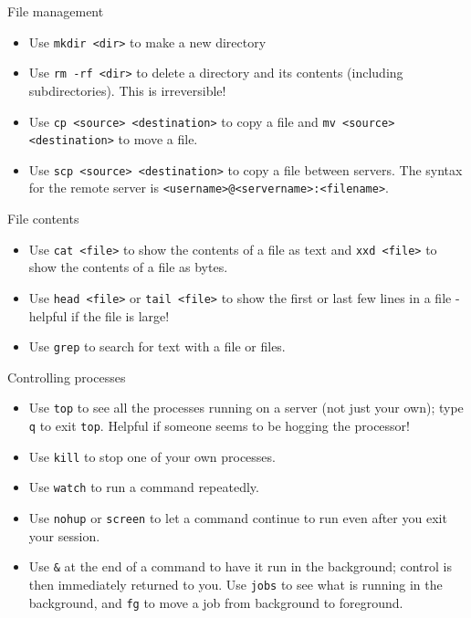 \documentclass[dvipsnames]{beamer}
\newcommand{\command}[1]{\colorbox{light-gray}{\texttt{#1}}}
\newcommand{\filename}[1]{\colorbox{light-green}{\texttt{#1}}}
\begin{document}
\begin{frame}{File management}
  \begin{itemize}
  \item Use \command{mkdir <dir>} to make a new directory
  \item Use \command{rm -rf <dir>} to delete a directory and its contents (including subdirectories). This is irreversible!
  \item Use \command{cp <source> <destination>} to copy a file and \command{mv <source> <destination>} to move a file.
  \item Use \command{scp <source> <destination>} to copy a file between servers. The syntax for the remote server is \filename{<username>@<servername>:<filename>}.
  \end{itemize}
\end{frame}


\begin{frame}{File contents}
  \begin{itemize}
  \item Use \command{cat <file>} to show the contents of a file as text and \command{xxd <file>} to show the contents of a file as bytes.
  \item Use \command{head <file>} or \command{tail <file>} to show the first or last few lines in a file - helpful if the file is large!
  \item Use \command{grep} to search for text with a file or files.
  \end{itemize}
\end{frame}


\begin{frame}{Controlling processes}
  \begin{itemize}
  \item Use \command{top} to see all the processes running on a server (not just your own); type \command{q} to exit \command{top}. Helpful if someone seems to be hogging the processor!
  \item Use \command{kill} to stop one of your own processes.
  \item Use \command{watch} to run a command repeatedly.
  \item Use \command{nohup} or \command{screen} to let a command continue to run even after you exit your session.
  \item Use \command{\&} at the end of a command to have it run in the background; control is then immediately returned to you. Use \command{jobs} to see what is running in the background, and \command{fg} to move a job from background to foreground.
  \end{itemize}
\end{frame}
\end{document}
